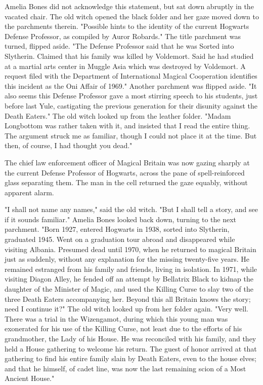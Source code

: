 Amelia Bones did not acknowledge this statement, but sat down abruptly in the 
vacated chair. The old witch opened the black folder and her gaze moved down to 
the parchments therein. "Possible hints to the identity of the current Hogwarts 
Defense Professor, as compiled by Auror Robards." The title parchment was 
turned, flipped aside. "The Defense Professor said that he was Sorted into 
Slytherin. Claimed that his family was killed by Voldemort. Said he had studied 
at a martial arts center in Muggle Asia which was destroyed by Voldemort. A 
request filed with the Department of International Magical Cooperation 
identifies this incident as the Oni Affair of 1969." Another parchment was 
flipped aside. "It also seems this Defense Professor gave a most stirring 
speech to his students, just before last Yule, castigating the previous 
generation for their disunity against the Death Eaters." The old witch looked 
up from the leather folder. "Madam Longbottom was rather taken with it, and 
insisted that I read the entire thing. The argument struck me as familiar, 
though I could not place it at the time. But then, of course, I had thought you 
dead."

The chief law enforcement officer of Magical Britain was now gazing sharply at 
the current Defense Professor of Hogwarts, across the pane of spell-reinforced 
glass separating them. The man in the cell returned the gaze equably, without 
apparent alarm.

"I shall not name any names," said the old witch. "But I shall tell a story, 
and see if it sounds familiar." Amelia Bones looked back down, turning to the 
next parchment. "Born 1927, entered Hogwarts in 1938, sorted into Slytherin, 
graduated 1945. Went on a graduation tour abroad and disappeared while visiting 
Albania. Presumed dead until 1970, when he returned to magical Britain just as 
suddenly, without any explanation for the missing twenty-five years. He 
remained estranged from his family and friends, living in isolation. In 1971, 
while visiting Diagon Alley, he fended off an attempt by Bellatrix Black to 
kidnap the daughter of the Minister of Magic, and used the Killing Curse to 
slay two of the three Death Eaters accompanying her. Beyond this all Britain 
knows the story; need I continue it?" The old witch looked up from her folder 
again. "Very well. There was a trial in the Wizengamot, during which this young 
man was exonerated for his use of the Killing Curse, not least due to the 
efforts of his grandmother, the Lady of his House. He was reconciled with his 
family, and they held a House gathering to welcome his return. The guest of 
honor arrived at that gathering to find his entire family slain by Death 
Eaters, even to the house elves; and that he himself, of cadet line, was now 
the last remaining scion of a Most Ancient House."

